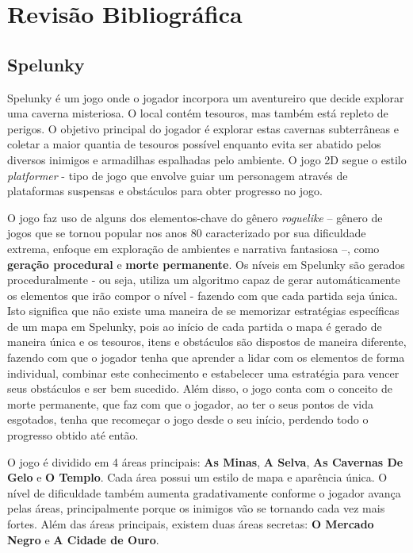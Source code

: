 \chapter{\label{chap:lit-review}Revisão Bibliográfica}

\section{Spelunky}
Spelunky \cite{SPELUNKYWEB} é um jogo onde o jogador incorpora um aventureiro
que decide explorar uma caverna misteriosa. O local contém tesouros, mas também
está repleto de perigos. O objetivo principal do jogador é explorar estas
cavernas subterrâneas e coletar a maior quantia de tesouros possível enquanto
evita ser abatido pelos diversos inimigos e armadilhas espalhadas pelo ambiente.
O jogo 2D segue o estilo \textit{platformer} - tipo de jogo que envolve guiar um
personagem através de plataformas suspensas e obstáculos para obter progresso no
jogo.

O jogo faz uso de alguns dos elementos-chave do gênero \textit{roguelike} --
gênero de jogos que se tornou popular nos anos 80 caracterizado por sua
dificuldade extrema, enfoque em exploração de ambientes e narrativa fantasiosa
--, como \textbf{geração procedural} e \textbf{morte permanente}. Os níveis em
Spelunky são gerados proceduralmente - ou seja, utiliza um algoritmo capaz de
gerar automáticamente os elementos que irão compor o nível - fazendo com que
cada partida seja única. Isto significa que não existe uma maneira de se
memorizar estratégias específicas de um mapa em Spelunky, pois ao início de cada
partida o mapa é gerado de maneira única e os tesouros, itens e obstáculos são
dispostos de maneira diferente, fazendo com que o jogador tenha que aprender a
lidar com os elementos de forma individual, combinar este conhecimento e
estabelecer uma estratégia para vencer seus obstáculos e ser bem sucedido. Além
disso, o jogo conta com o conceito de morte permanente, que faz com que o
jogador, ao ter o seus pontos de vida esgotados, tenha que recomeçar o jogo
desde o seu início, perdendo todo o progresso obtido até então.

O jogo é dividido em 4 áreas principais: \textbf{As Minas}, \textbf{A Selva},
\textbf{As Cavernas De Gelo} e \textbf{O Templo}. Cada área possui um estilo de
mapa e aparência única. O nível de dificuldade também aumenta gradativamente
conforme o jogador avança pelas áreas, principalmente porque os inimigos
vão se tornando cada vez mais fortes. Além das áreas principais, existem duas
áreas secretas: \textbf{O Mercado Negro} e \textbf{A Cidade de Ouro}.

